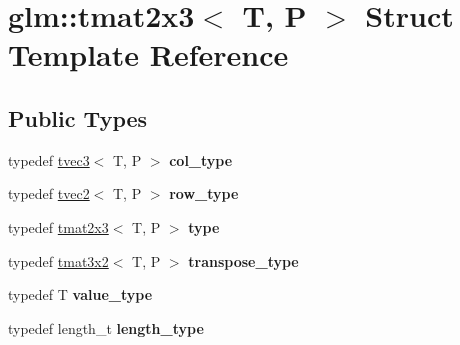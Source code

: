 \hypertarget{structglm_1_1tmat2x3}{\section{glm\-:\-:tmat2x3$<$ T, P $>$ Struct Template Reference}
\label{structglm_1_1tmat2x3}
}
\subsection*{Public Types}
\begin{DoxyCompactItemize}
\item 
\hypertarget{structglm_1_1tmat2x3_a62523fc3d245c37e15d68c3b9729f366}{typedef \hyperlink{structglm_1_1tvec3}{tvec3}$<$ T, P $>$ {\bfseries col\-\_\-type}}\label{structglm_1_1tmat2x3_a62523fc3d245c37e15d68c3b9729f366}

\item 
\hypertarget{structglm_1_1tmat2x3_a0cce885b1659b852ff0290413ce02238}{typedef \hyperlink{structglm_1_1tvec2}{tvec2}$<$ T, P $>$ {\bfseries row\-\_\-type}}\label{structglm_1_1tmat2x3_a0cce885b1659b852ff0290413ce02238}

\item 
\hypertarget{structglm_1_1tmat2x3_af35f08ee62979a5e377b5f5262c57937}{typedef \hyperlink{structglm_1_1tmat2x3}{tmat2x3}$<$ T, P $>$ {\bfseries type}}\label{structglm_1_1tmat2x3_af35f08ee62979a5e377b5f5262c57937}

\item 
\hypertarget{structglm_1_1tmat2x3_adade07dec727cac2e2463d8c765f133d}{typedef \hyperlink{structglm_1_1tmat3x2}{tmat3x2}$<$ T, P $>$ {\bfseries transpose\-\_\-type}}\label{structglm_1_1tmat2x3_adade07dec727cac2e2463d8c765f133d}

\item 
\hypertarget{structglm_1_1tmat2x3_a73172253a573f98aa06474e043cc03af}{typedef T {\bfseries value\-\_\-type}}\label{structglm_1_1tmat2x3_a73172253a573f98aa06474e043cc03af}

\item 
\hypertarget{structglm_1_1tmat2x3_a25be85bf523cf3daa1c2b6b00ad45c82}{typedef length\-\_\-t {\bfseries length\-\_\-type}}\label{structglm_1_1tmat2x3_a25be85bf523cf3daa1c2b6b00ad45c82}

\end{DoxyCompactItemize}
